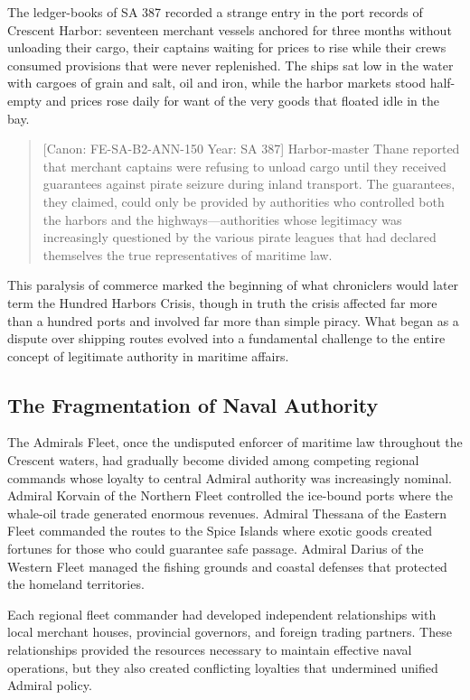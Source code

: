 The ledger-books of SA 387 recorded a strange entry in the port records
of Crescent Harbor: seventeen merchant vessels anchored for three months
without unloading their cargo, their captains waiting for prices to rise
while their crews consumed provisions that were never replenished. The
ships sat low in the water with cargoes of grain and salt, oil and iron,
while the harbor markets stood half-empty and prices rose daily for want
of the very goods that floated idle in the bay.

\begin{quote}
{[}Canon: FE-SA-B2-ANN-150 \textbar{} Year: SA 387{]} Harbor-master
Thane reported that merchant captains were refusing to unload cargo
until they received guarantees against pirate seizure during inland
transport. The guarantees, they claimed, could only be provided by
authorities who controlled both the harbors and the
highways---authorities whose legitimacy was increasingly questioned by
the various pirate leagues that had declared themselves the true
representatives of maritime law.
\end{quote}

This paralysis of commerce marked the beginning of what chroniclers
would later term the Hundred Harbors Crisis, though in truth the crisis
affected far more than a hundred ports and involved far more than simple
piracy. What began as a dispute over shipping routes evolved into a
fundamental challenge to the entire concept of legitimate authority in
maritime affairs.

\subsection{The Fragmentation of Naval
Authority}\label{the-fragmentation-of-naval-authority}

The Admiral\textquotesingle s Fleet, once the undisputed enforcer of
maritime law throughout the Crescent waters, had gradually become
divided among competing regional commands whose loyalty to central
Admiral authority was increasingly nominal. Admiral Korvain of the
Northern Fleet controlled the ice-bound ports where the whale-oil trade
generated enormous revenues. Admiral Thessana of the Eastern Fleet
commanded the routes to the Spice Islands where exotic goods created
fortunes for those who could guarantee safe passage. Admiral Darius of
the Western Fleet managed the fishing grounds and coastal defenses that
protected the homeland territories.

Each regional fleet commander had developed independent relationships
with local merchant houses, provincial governors, and foreign trading
partners. These relationships provided the resources necessary to
maintain effective naval operations, but they also created conflicting
loyalties that undermined unified Admiral policy.


